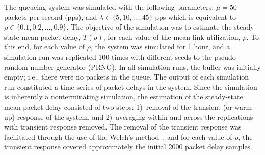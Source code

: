 The queueing system was simulated with the following parameters: $\mu=50$ packets per second (pps), and $\lambda\in\{5,10,\ldots,45\}$ pps which is equivalent to $\rho\in\{0.1,0.2,\ldots,0.9\}$. The objective of the simulation was to estimate the steady-state mean packet delay, $T(\rho)$, for each value of the mean link utilization, $\rho$. To this end, for each value of $\rho$, the system was simulated for 1 hour, and a simulation run was replicated 100 times with different seeds to the pseudo-random number generator (PRNG). In all simulation runs, the buffer was initially empty; i.e., there were no packets in the queue. The output of each simulation run constituted a time-series of packet delays in the system. Since the simulation is inherently a nonterminating simulation, the estimation of the steady-state mean packet delay consisted of two steps: 1)~removal of the transient (or warm-up) response of the system, and 2)~averaging within and across the replications with transient response removed. The removal of the transient response was facilitated through the use of the Welch's method~\cite{LawChapter92007}, and for each value of $\rho$, the transient response covered approximately the initial 2000 packet delay samples.

